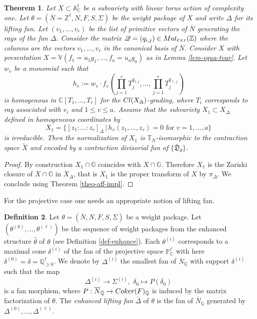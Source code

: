 \documentclass[11pt, reqno]{amsart}
\theoremstyle{plain}
\newtheorem{theorem}{Theorem}[section]
\theoremstyle{definition}
\newtheorem{definition}[theorem]{Definition}
\theoremstyle{remark}
\begin{document}
\begin{theorem}\label{lem-Q}
Let $X\subset \mathbb{A}^{\ell}_{\mathbb{C}}$ be a subvariety with linear torus action of complexity one.
Let $\theta  =  (\overline{N}=  \mathbb{Z}^{\ell}, N, F, S, \Sigma)$ be the weight package of $X$ and write $\Delta$ for its lifting fan. Let $(v_{1}, \ldots, v_{r})$ be the list of primitive vectors of $\overline{N}$ generating the rays of the fan $\Delta$. Consider the matrix 
$\mathscr{Q} =  (q_{i,j})\in {\rm Mat}_{\ell\times r}(\mathbb{Z})$ where the columns are the vectors $v_{1}, \ldots, v_{r}$ in the canonical basis of $\overline{N} $. Consider $X$ with presentation $X =  \mathbb{V}(f_{1} =  u_{1}g_{1}, \ldots, f_{a} =  u_{a}g_{a})$ as in Lemma \ref{lem-equa-tvar}. Let $w_{v}$ be a monomial such that
$$h_{v} := w_{v}\cdot f_{v}\left(\prod_{j =  1}^{r}T_{j}^{q_{1, j}}, \ldots, \prod_{j = 1}^{r}T_{j}^{q_{\ell, j}}\right)$$
is homogenous in $\mathbb{C}[T_{1}, \ldots, T_{r}]$ for the ${\rm Cl}(X_{\Delta})$-grading, where $T_{i}$ corresponds 
to ray associated with $v_{i}$ and $1\leq v\leq a$. Assume that the subvariety $X_{1}\subset X_{\Delta}$ defined in homogeneous coordinates by 
$$X_{1} =  \{[z_{1}: \ldots: z_{r}]_{\Delta}\,|\, h_{v}(z_{1}, \ldots, z_{r}) =  0 \text{ for }v=1, \ldots, a\}$$
is irreducible. Then the normalization of $X_{1}$ is $\mathbb{T}_{N}$-isomorphic to the contraction space $\widetilde{X}$ and encoded
by a contraction divisorial fan  of $\{\bar{\mathfrak{D}}_{\theta}\}$.
\end{theorem}
\begin{proof}
By construction $X_{1}\cap \mathbb{G}$ coincides with $X\cap \mathbb{G}$. Therefore $X_{1}$ is the Zariski closure 
of $X\cap \mathbb{G}$ in $X_{\Delta}$, that is $X_{1}$ is the proper transform of $X$ by $\pi_{\Delta}$. We conclude using Theorem \ref{theo-aff-impl}.
\end{proof}
For the projective case one needs an appropriate notion of lifting fan.
\begin{definition}
Let $\theta =  (\overline{N}, N, F, S, \Sigma)$ be a weight package. Let $(\theta^{(0)}, \ldots, \theta^{(\ell)})$ be the 
sequence of weight packages from the enhanced structure $\widehat{\theta}$ of $\theta$ (see Definition \ref{def-enhance}). Each $\theta^{(i)}$ corresponds to a maximal cone $\delta^{(i)}$ of the fan of the projective space $\mathbb{P}_{\mathbb{C}}^{\ell}$ with
here $\delta^{(0)} =  \delta =  \mathbb{Q}_{\geq 0}^{\ell}$. We denote by $\Delta^{(i)}$ the smallest fan of $\overline{N}_{\mathbb{Q}}$ with support $\delta^{(i)}$ such that the map
$$\Delta^{(i)}\rightarrow \Sigma^{(i)},\,\, \delta_{0}\mapsto P(\delta_{0})$$
is a fan morphism, where $P: \overline{N}_{ \mathbb{Q}}\rightarrow {\rm Coker}(F)_{\mathbb{Q}}$ is induced 
by the matrix factorization of $\theta$. The \emph{enhanced lifting fan} $\bar{\Delta}$ of $\theta$ is the fan of $\overline{N}_{\mathbb{Q}}$ generated by $\Delta^{(0)}, \ldots, \Delta^{(\ell)}$. 
\end{definition}
\end{document}
